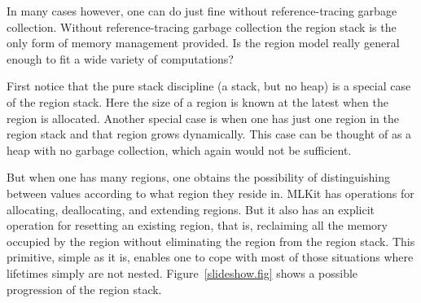 \documentclass[12pt]{book}
\begin{document}
In many cases however, one can do just fine without reference-tracing garbage
collection. Without reference-tracing garbage collection the region stack is the
only form of memory management provided. Is the region model really general
enough to fit a wide variety of computations?

First notice that the pure
%
%
stack discipline (a stack, but no heap) is a special case of the region
stack. Here the size of a region is known at the latest when the region is
allocated. Another special case is when one has just one region in the region
stack and that region grows dynamically.  This case can be thought of as a
%
%
heap with no garbage collection, which again would not be sufficient.

But when one has many regions, one obtains the possibility of distinguishing
between values according to what region they reside in.  MLKit has
operations for allocating, deallocating, and extending regions. But it also has
an explicit operation for
%
%
resetting an existing region, that is, reclaiming all the memory occupied by the
region without eliminating the region from the region stack.  This primitive,
simple as it is, enables one to cope with most of those situations where
lifetimes simply are not nested.  Figure~\ref{slideshow.fig} shows a possible
progression of the region stack.
\end{document}
